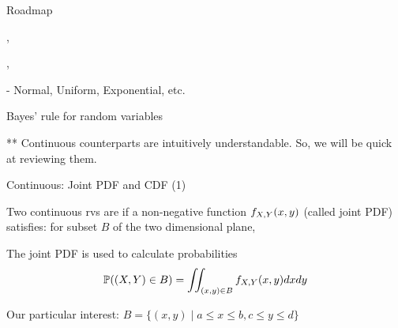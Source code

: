 \documentclass[fleqn,aspectratio=169]{beamer}
\begin{document}
\begin{frame}{Roadmap}

\plitemsep 0.05in

\bci [$\circ$]
\item {}

\item {}

\item {},  

\item {},  

\item {}

- Normal, Uniform, Exponential, etc. 

\item Bayes' rule for random variables

\eci 

\medskip

** Continuous counterparts are intuitively understandable. So, we will be quick at reviewing them.

\end{frame}

\begin{frame}{Continuous: Joint PDF and CDF (1)}

{
Two continuous rvs are  if a non-negative function $f_{X,Y}(x,y)$ (called joint PDF) satisfies: for  subset $B$ of the two dimensional plane,
\vspace{-0.3cm}
}

\plitemsep 0.1in
\bce 
\item<3-> The joint PDF is used to calculate probabilities  
$$\mathbb{P}( (X,Y) \in B ) = \iint_{(x,y) \in B} f_{X,Y}(x,y) dx dy$$

Our particular interest: $B = \{(x,y) \mid a \le x \le b, c \le y \le d \}$
\ece

\end{frame}
\end{document}
